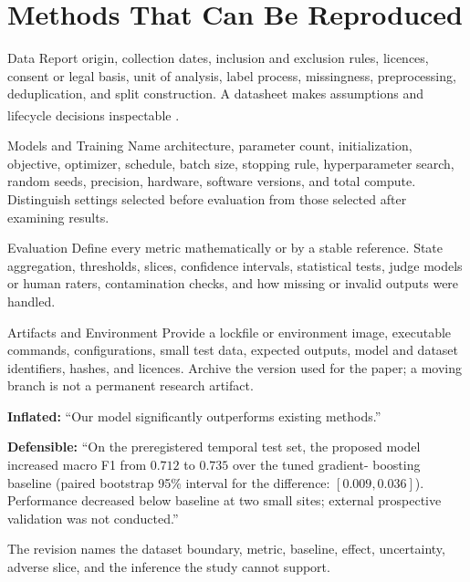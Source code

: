 \section{Methods That Can Be Reproduced}

\begin{v3topic}{Data}
Report origin, collection dates, inclusion and exclusion rules, licences,
consent or legal basis, unit of analysis, label process, missingness,
preprocessing, deduplication, and split construction.
A datasheet makes assumptions and lifecycle decisions inspectable
\textsuperscript{\cite{gebruDatasheetsDatasets2021}}.

\end{v3topic}
\begin{v3topic}{Models and Training}
Name architecture, parameter count, initialization, objective, optimizer,
schedule, batch size, stopping rule, hyperparameter search, random seeds,
precision, hardware, software versions, and total compute.
Distinguish settings selected before evaluation from those selected after
examining results.

\end{v3topic}
\begin{v3topic}{Evaluation}
Define every metric mathematically or by a stable reference.
State aggregation, thresholds, slices, confidence intervals, statistical
tests, judge models or human raters, contamination checks, and how missing or
invalid outputs were handled.

\end{v3topic}
\begin{v3topic}{Artifacts and Environment}
Provide a lockfile or environment image, executable commands, configurations,
small test data, expected outputs, model and dataset identifiers, hashes, and
licences.
Archive the version used for the paper; a moving branch is not a permanent
research artifact.
\end{v3topic}

\begin{workedexample}
\textbf{Inflated:} ``Our model significantly outperforms existing methods.''

\textbf{Defensible:} ``On the preregistered temporal test set, the proposed
model increased macro F1 from $0.712$ to $0.735$ over the tuned gradient-
boosting baseline (paired bootstrap 95\% interval for the difference:
$[0.009,0.036]$). Performance decreased below baseline at two small sites;
external prospective validation was not conducted.''

The revision names the dataset boundary, metric, baseline, effect,
uncertainty, adverse slice, and the inference the study cannot support.
\end{workedexample}


